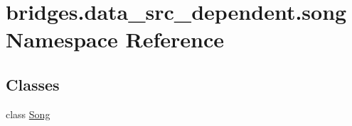 \hypertarget{namespacebridges_1_1data__src__dependent_1_1song}{}\section{bridges.\+data\+\_\+src\+\_\+dependent.\+song Namespace Reference}
\label{namespacebridges_1_1data__src__dependent_1_1song}
\subsection*{Classes}
\begin{DoxyCompactItemize}
\item 
class \mbox{\hyperlink{classbridges_1_1data__src__dependent_1_1song_1_1_song}{Song}}
\end{DoxyCompactItemize}
